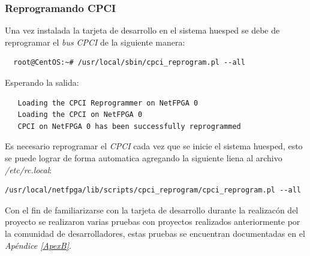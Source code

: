   
 \subsubsection{Reprogramando CPCI}
 
Una vez instalada la tarjeta de desarrollo en el sistema huesped se debe de
reprogramar el \emph{bus} \emph{CPCI} de la siguiente manera:

  \begin{verbatim}
  root@CentOS:~# /usr/local/sbin/cpci_reprogram.pl --all  
  \end{verbatim}
  
 Esperando la salida:
 
   \begin{verbatim}
   Loading the CPCI Reprogrammer on NetFPGA 0   
   Loading the CPCI on NetFPGA 0   
   CPCI on NetFPGA 0 has been successfully reprogrammed 
  \end{verbatim}
 
 Es necesario reprogramar el \emph{CPCI} cada vez que se inicie el sistema
huesped, esto se puede lograr de forma automatica agregando la siguiente liena
al archivo \emph{/etc/rc.local}:

   \begin{verbatim}
/usr/local/netfpga/lib/scripts/cpci_reprogram/cpci_reprogram.pl --all 
  \end{verbatim}
  

Con el fin de familiarizarse con la tarjeta de desarrollo durante la realizacón
del proyecto se realizaron varias pruebas con proyectos realizados
anteriormente por la comunidad de desarrolladores, estas pruebas se encuentran
documentadas en el \emph{Apéndice \ref{ApexB}}.             

